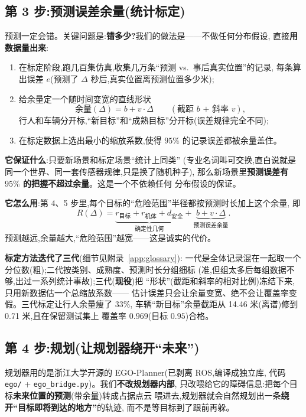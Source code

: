 \documentclass[11pt]{ctexart}
\newcommand{\code}[1]{\texttt{#1}}
\begin{document}
\subsection{第 3 步:预测误差余量(统计标定)}\label{sec:conformal}

预测一定会错。关键问题是:\textbf{错多少?}我们的做法是——不做任何分布假设,
直接\textbf{用数据量出来}:

\begin{enumerate}
  \item 在标定阶段,跑几百集仿真,收集几万条``预测 vs.\ 事后真实位置''的记录,
        每条算出误差 $e$(预测了 $\Delta$ 秒后,真实位置离预测位置多少米);
  \item 给余量定一个随时间变宽的直线形状
        \[
          \text{余量}(\Delta) = b + v\cdot\Delta
          \qquad(\text{截距 } b \text{ + 斜率 } v),
        \]
        行人和车辆分开标,``新目标''和``成熟目标''分开标(误差规律完全不同);
  \item 在标定数据上选出最小的缩放系数,使得 $95\%$ 的记录误差都被余量盖住。
\end{enumerate}

\textbf{它保证什么}:只要新场景和标定场景``统计上同类''
(专业名词叫可交换,直白说就是同一个世界、同一套传感器规律,只是换了随机种子),
那么新场景里\textbf{预测误差有 $95\%$ 的把握不超过余量}。这是一个不依赖任何
分布假设的保证。

\textbf{它怎么用}:第 4、5 步里,每个目标的``危险范围''半径都按预测时长加上这个余量,
即
\[
  R(\Delta) = \underbrace{r_{\text{目标}} + r_{\text{机体}} + d_{\text{安全}}}_{\text{确定性几何}}
            + \underbrace{b + v\cdot\Delta}_{\text{预测误差余量}} .
\]
预测越远,余量越大,``危险范围''越宽——这是诚实的代价。

\textbf{标定方法迭代了三代}(细节见附录~\ref{app:glossary}):
一代是全体记录混在一起取一个分位数(粗);二代按类别、成熟度、预测时长分组细标
(准,但组太多后每组数据不够,出过一系列统计事故);三代(\textbf{现役})把
``形状''(截距和斜率的相对比例)冻结下来,只用新数据估一个总缩放系数——
估计误差只会让余量变宽、绝不会让覆盖率变假。三代标定让行人余量瘦了 $33\%$,
车辆``新目标''余量截距从 14.46 米(离谱)修到 0.71 米,且在保留测试集上
覆盖率 $0.969$(目标 $0.95$)合格。

\subsection{第 4 步:规划(让规划器绕开``未来'')}

规划器用的是浙江大学开源的 EGO-Planner(已剥离 ROS,编译成独立库,
代码 \code{ego/} + \code{ego\_bridge.py})。我们\textbf{不改规划器内部},
只改喂给它的障碍信息:把每个目标\textbf{未来位置的预测}(带余量)转成占据点云
喂进去,规划器就会自然规划出一条\textbf{绕开``目标即将到达的地方''}的轨迹,
而不是等目标到了跟前再躲。
\end{document}
